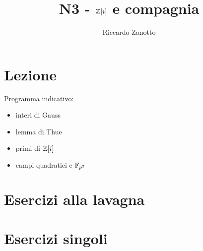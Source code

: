 \documentclass[12pt]{article}
\author{Riccardo Zanotto}
\title{N3 - $\mathbb{Z}[i]$ e compagnia}
\begin{document}
\maketitle


\section{Lezione}

Programma indicativo:

\begin{itemize}
    \item interi di Gauss
    \item lemma di Thue
    \item primi di $\mathbb{Z}[i]$
    \item campi quadratici e $\mathbb{F}_{p^2}$
\end{itemize}

\section{Esercizi alla lavagna}

\section{Esercizi singoli}
\end{document}
